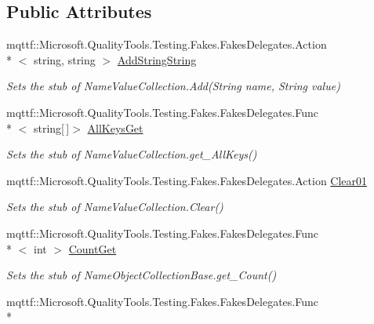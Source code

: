 \subsection*{Public Attributes}
\begin{DoxyCompactItemize}
\item 
mqttf\-::\-Microsoft.\-Quality\-Tools.\-Testing.\-Fakes.\-Fakes\-Delegates.\-Action\\*
$<$ string, string $>$ \hyperlink{class_system_1_1_collections_1_1_specialized_1_1_fakes_1_1_stub_name_value_collection_a2e1e89696036fa68d23f473c2124a9c6}{Add\-String\-String}
\begin{DoxyCompactList}\small\item\em Sets the stub of Name\-Value\-Collection.\-Add(\-String name, String value)\end{DoxyCompactList}\item 
mqttf\-::\-Microsoft.\-Quality\-Tools.\-Testing.\-Fakes.\-Fakes\-Delegates.\-Func\\*
$<$ string\mbox{[}$\,$\mbox{]}$>$ \hyperlink{class_system_1_1_collections_1_1_specialized_1_1_fakes_1_1_stub_name_value_collection_a6101d0d0b8adb9337ae40bf4080f8b03}{All\-Keys\-Get}
\begin{DoxyCompactList}\small\item\em Sets the stub of Name\-Value\-Collection.\-get\-\_\-\-All\-Keys()\end{DoxyCompactList}\item 
mqttf\-::\-Microsoft.\-Quality\-Tools.\-Testing.\-Fakes.\-Fakes\-Delegates.\-Action \hyperlink{class_system_1_1_collections_1_1_specialized_1_1_fakes_1_1_stub_name_value_collection_a27dffdd7ba71b6511a9bd481575f807c}{Clear01}
\begin{DoxyCompactList}\small\item\em Sets the stub of Name\-Value\-Collection.\-Clear()\end{DoxyCompactList}\item 
mqttf\-::\-Microsoft.\-Quality\-Tools.\-Testing.\-Fakes.\-Fakes\-Delegates.\-Func\\*
$<$ int $>$ \hyperlink{class_system_1_1_collections_1_1_specialized_1_1_fakes_1_1_stub_name_value_collection_ae178f5c4fb015139f88001d0e50e035a}{Count\-Get}
\begin{DoxyCompactList}\small\item\em Sets the stub of Name\-Object\-Collection\-Base.\-get\-\_\-\-Count()\end{DoxyCompactList}\item 
mqttf\-::\-Microsoft.\-Quality\-Tools.\-Testing.\-Fakes.\-Fakes\-Delegates.\-Func\\*

\end{DoxyCompactItemize}
